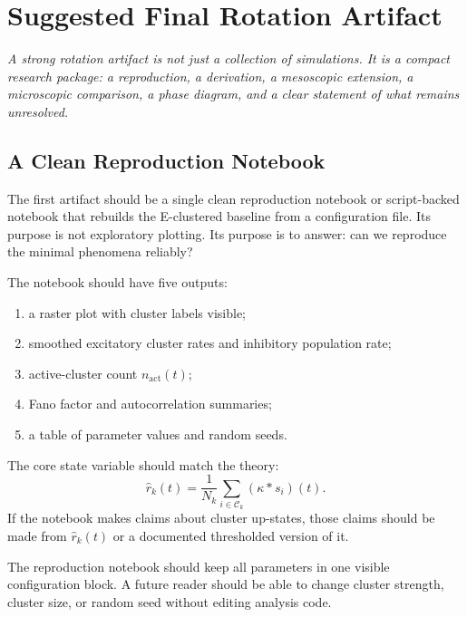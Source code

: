 \chapter{Suggested Final Rotation Artifact}
\label{ch:final-rotation-artifact}

\textit{A strong rotation artifact is not just a collection of simulations. It is a compact research package: a reproduction, a derivation, a mesoscopic extension, a microscopic comparison, a phase diagram, and a clear statement of what remains unresolved.}

\section{A Clean Reproduction Notebook}
\label{sec:clean-reproduction-notebook}

The first artifact should be a single clean reproduction notebook or script-backed notebook that rebuilds the E-clustered baseline from a configuration file. Its purpose is not exploratory plotting. Its purpose is to answer: can we reproduce the minimal phenomena reliably?

The notebook should have five outputs:
%
\begin{enumerate}[leftmargin=*]
  \item a raster plot with cluster labels visible;
  \item smoothed excitatory cluster rates and inhibitory population rate;
  \item active-cluster count $n_{\mathrm{act}}(t)$;
  \item Fano factor and autocorrelation summaries;
  \item a table of parameter values and random seeds.
\end{enumerate}

The core state variable should match the theory:
%
\begin{equation}
  \widehat r_k(t)
  =
  \frac{1}{N_k}
  \sum_{i\in \mathcal{C}_k}(\kappa*s_i)(t).
  \label{eq:artifact-cluster-rate}
\end{equation}
%
If the notebook makes claims about cluster up-states, those claims should be made from $\widehat r_k(t)$ or a documented thresholded version of it.

The reproduction notebook should keep all parameters in one visible configuration block. A future reader should be able to change cluster strength, cluster size, or random seed without editing analysis code.


